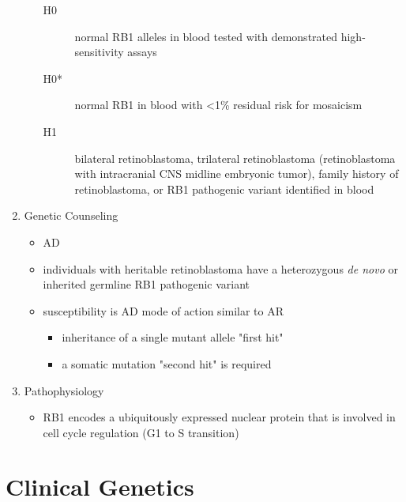 \documentclass[12pt]{scrartcl}
\begin{document}
\begin{enumerate}
\begin{itemize}
\begin{description}
\item[{H0}] normal RB1 alleles in blood tested with demonstrated
high-sensitivity assays

\item[{H0*}] normal RB1 in blood with <1\% residual risk for mosaicism

\item[{H1}] bilateral retinoblastoma, trilateral retinoblastoma
(retinoblastoma with intracranial CNS midline embryonic
tumor), family history of retinoblastoma, or RB1 pathogenic
variant identified in blood
\end{description}
\end{itemize}

\item Genetic Counseling
\label{sec:org62ad77c}
\begin{itemize}
\item AD
\item individuals with heritable retinoblastoma have a heterozygous \emph{de
novo} or inherited germline RB1 pathogenic variant
\item susceptibility is AD mode of action similar to AR
\begin{itemize}
\item inheritance of a single mutant allele "first hit"
\item a somatic mutation "second hit" is required
\end{itemize}
\end{itemize}
\item Pathophysiology
\label{sec:orgdde2986}
\begin{itemize}
\item RB1 encodes a ubiquitously expressed nuclear protein that is
involved in cell cycle regulation (G1 to S transition)
\end{itemize}
\end{enumerate}

\section{Clinical Genetics}
\label{sec:orgb15da56}
\end{document}

